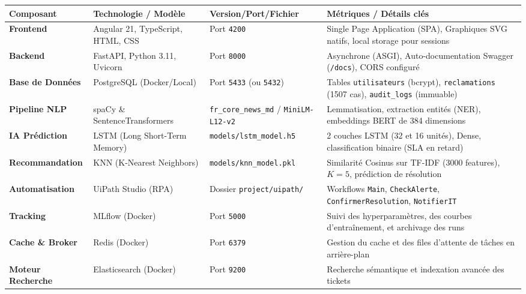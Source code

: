 \documentclass[11pt,a4paper]{article}
\begin{document}
\begin{table}[h!]
\centering
\small
\renewcommand{\arraystretch}{1.3}
\begin{tabularx}{\textwidth}{l p{4.5cm} l X}
\toprule
\textbf{\color{primaryblue}Composant} & \textbf{\color{primaryblue}Technologie / Modèle} & \textbf{\color{primaryblue}Version/Port/Fichier} & \textbf{\color{primaryblue}Métriques / Détails clés} \\
\midrule
\textbf{Frontend} & Angular 21, TypeScript, HTML, CSS & Port \texttt{4200} & Single Page Application (SPA), Graphiques SVG natifs, local storage pour sessions \\
\textbf{Backend} & FastAPI, Python 3.11, Uvicorn & Port \texttt{8000} & Asynchrone (ASGI), Auto-documentation Swagger (\texttt{/docs}), CORS configuré \\
\textbf{Base de Données} & PostgreSQL (Docker/Local) & Port \texttt{5433} (ou \texttt{5432}) & Tables \texttt{utilisateurs} (bcrypt), \texttt{reclamations} (1507 cas), \texttt{audit\_logs} (immuable) \\
\textbf{Pipeline NLP} & spaCy \& SentenceTransformers & \texttt{fr\_core\_news\_md} / \texttt{MiniLM-L12-v2} & Lemmatisation, extraction entités (NER), embeddings BERT de 384 dimensions \\
\textbf{IA Prédiction} & LSTM (Long Short-Term Memory) & \texttt{models/lstm\_model.h5} & 2 couches LSTM (32 et 16 unités), Dense, classification binaire (SLA en retard) \\
\textbf{Recommandation} & KNN (K-Nearest Neighbors) & \texttt{models/knn\_model.pkl} & Similarité Cosinus sur TF-IDF (3000 features), $K=5$, prédiction de résolution \\
\textbf{Automatisation} & UiPath Studio (RPA) & Dossier \texttt{project/uipath/} & Workflows \texttt{Main}, \texttt{CheckAlerte}, \texttt{ConfirmerResolution}, \texttt{NotifierIT} \\
\textbf{Tracking} & MLflow (Docker) & Port \texttt{5000} & Suivi des hyperparamètres, des courbes d'entraînement, et archivage des runs \\
\textbf{Cache \& Broker} & Redis (Docker) & Port \texttt{6379} & Gestion du cache et des files d'attente de tâches en arrière-plan \\
\textbf{Moteur Recherche} & Elasticsearch (Docker) & Port \texttt{9200} & Recherche sémantique et indexation avancée des tickets \\
\bottomrule
\end{tabularx}
\end{table}
\end{document}
